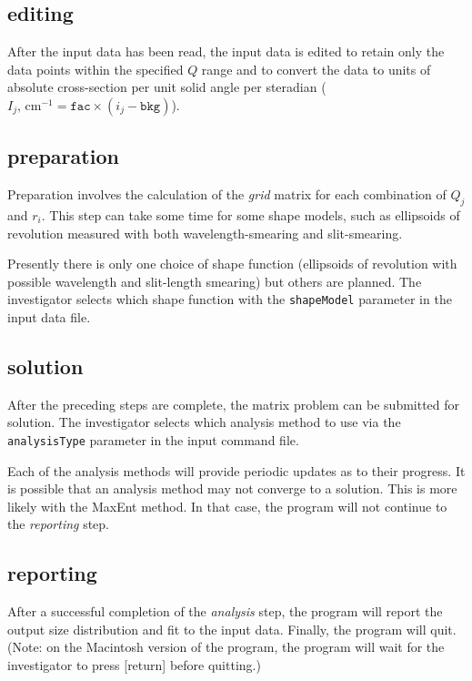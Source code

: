 \documentclass[letterpaper]{article}
\begin{document}
\subsection{editing}

After the input data has been read, the input data is 
edited to retain only the data points within the 
specified $Q$ range and to convert the data to units 
of absolute cross-section per unit solid angle per 
steradian ($I_j, \, \mbox{cm}^{-1} = \mathtt{fac} \times
(i_j - \mathtt{bkg})$).

\subsection{preparation}

Preparation involves the calculation of the 
\emph{grid} matrix for each combination of $Q_j$ and 
$r_i$.  This step can take some time for some shape 
models, such as ellipsoids of revolution measured 
with both wavelength-smearing and slit-smearing.

Presently there is only one choice of shape function 
(ellipsoids of revolution with possible wavelength 
and slit-length smearing)
but others are planned.  The investigator selects which shape 
function with the \texttt{shapeModel} parameter in 
the input data file.

\subsection{solution}

After the preceding steps are complete, the matrix 
problem can be submitted for solution.  The investigator 
selects which analysis method to use via the 
\texttt{analysisType} parameter in the input command 
file.

Each of the analysis methods will provide periodic 
updates as to their progress.  It is possible that an 
analysis method may not converge to a solution.  This 
is more likely with the MaxEnt method.  In that case, 
the program will not continue to the \emph{reporting} step.

\subsection{reporting}

After a successful completion of the \emph{analysis} 
step, the program will report the output size 
distribution and fit to the input data.  Finally, the 
program will quit.  (Note: on the Macintosh version 
of the program, the program will wait for the investigator to 
press [return] before quitting.)
\end{document}
